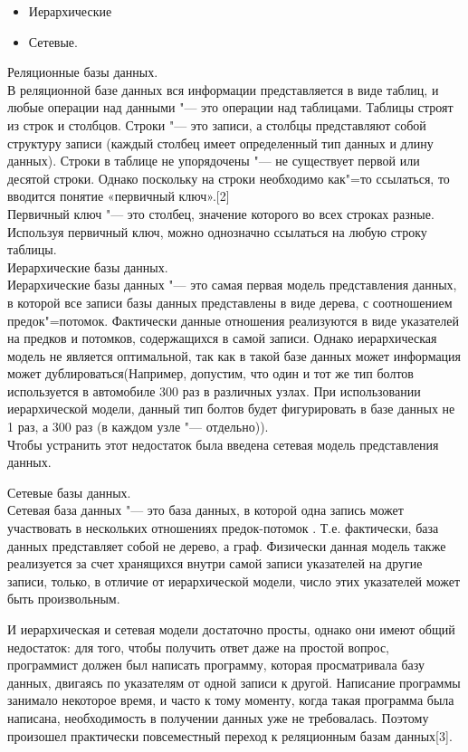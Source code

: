 \begin{flushleft}
\begin{itemize}
        \item Иерархические
        
        \item Сетевые.
    \end{itemize}

Реляционные базы данных.\\
В реляционной базе данных вся информации представляется в виде таблиц, 
и любые операции над данными "--- это операции над таблицами. Таблицы строят 
из строк и столбцов. Строки "--- это записи, а столбцы представляют собой 
структуру записи (каждый столбец имеет определенный тип данных и длину данных). 
Строки в таблице не упорядочены "--- не существует первой или десятой строки. 
Однако поскольку на строки необходимо как"=то ссылаться, то вводится понятие «первичный ключ».[2]\\

Первичный ключ "--- это столбец, значение которого во всех строках разные. Используя 
первичный ключ, можно однозначно ссылаться на любую строку таблицы.\\

Иерархические базы данных.\\
Иерархические базы данных "--- это самая первая модель представления данных,
в которой все записи базы данных представлены в виде дерева, с соотношением предок"=потомок.
Фактически данные отношения реализуются в виде указателей на предков и потомков, содержащихся в самой записи.
Однако иерархическая модель не является оптимальной, так как в такой базе данных может 
информация может дублироваться(Например, допустим, что один и тот же тип болтов используется в 
автомобиле 300 раз в различных узлах. При использовании иерархической модели, данный 
тип болтов будет фигурировать в базе данных не 1 раз, а 300 раз (в каждом узле "--- отдельно)).\\

Чтобы устранить этот недостаток была введена сетевая модель представления данных.

Сетевые базы данных.\\
Сетевая база данных "--- это база данных, в которой одна запись может участвовать в нескольких отношениях предок-потомок . 
Т.е. фактически, база данных представляет собой не дерево, а граф.
Физически данная модель также реализуется за счет хранящихся внутри самой записи указателей на другие записи, только, 
в отличие от иерархической модели, число этих указателей может быть произвольным.

И иерархическая и сетевая модели достаточно просты, однако они имеют общий недостаток: для того, 
чтобы получить ответ даже на простой вопрос, программист должен был написать программу, которая 
просматривала базу данных, двигаясь по указателям от одной записи к другой. Написание программы 
занимало некоторое время, и часто к тому моменту, когда такая программа была написана, необходимость 
в получении данных уже не требовалась. Поэтому произошел практически повсеместный переход к реляционным базам данных[3].


\end{flushleft}
